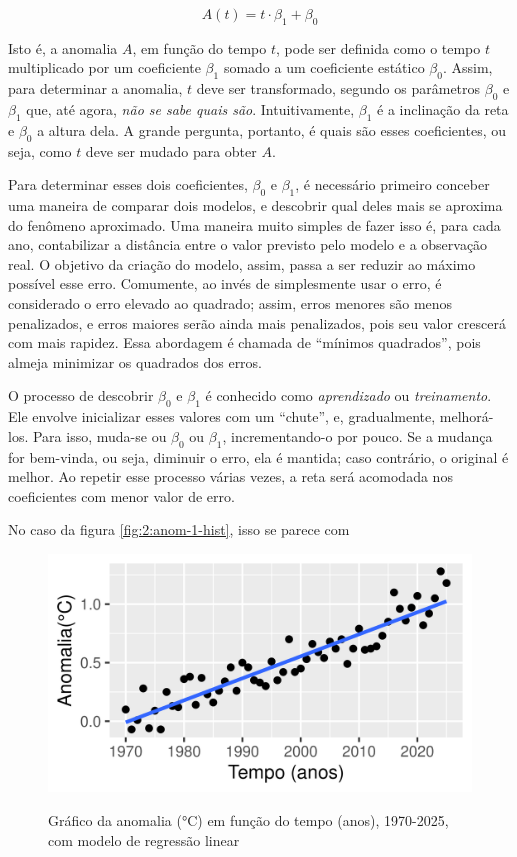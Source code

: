 \begin{equation}
A(t) = t\cdot\beta_1 + \beta_0
\end{equation}

Isto é, a anomalia $A$, em função do tempo $t$, pode ser definida como o tempo $t$ multiplicado por um coeficiente $\beta_1$ somado a um coeficiente estático $\beta_0$.
Assim, para determinar a anomalia, $t$ deve ser transformado, segundo os parâmetros $\beta_0$ e $\beta_1$ que, até agora, \textit{não se sabe quais são}.
Intuitivamente, $\beta_1$ é a inclinação da reta e $\beta_0$ a altura dela.
A grande pergunta, portanto, é quais são esses coeficientes, ou seja, como $t$ deve ser mudado para obter $A$.

Para determinar esses dois coeficientes, $\beta_0$ e $\beta_1$, é necessário primeiro conceber uma maneira de comparar dois modelos, e descobrir qual deles mais se aproxima do fenômeno aproximado.
Uma maneira muito simples de fazer isso é, para cada ano, contabilizar a distância entre o valor previsto pelo modelo e a observação real.
O objetivo da criação do modelo, assim, passa a ser reduzir ao máximo possível esse erro.
Comumente, ao invés de simplesmente usar o erro, é considerado o erro elevado ao quadrado; assim, erros menores são menos penalizados, e erros maiores serão ainda mais penalizados, pois seu valor crescerá com mais rapidez.
Essa abordagem é chamada de ``mínimos quadrados'', pois almeja minimizar os quadrados dos erros.

O processo de descobrir $\beta_0$ e $\beta_1$ é conhecido como \textit{aprendizado} ou \textit{treinamento}.
Ele envolve inicializar esses valores com um ``chute'', e, gradualmente, melhorá-los.
Para isso, muda-se ou $\beta_0$ ou $\beta_1$, incrementando-o por pouco. 
Se a mudança for bem-vinda, ou seja, diminuir o erro, ela é mantida; caso contrário, o original é melhor.
Ao repetir esse processo várias vezes, a reta será acomodada nos coeficientes com menor valor de erro.

No caso da figura \ref{fig:2:anom-1-hist}, isso se parece com 

\begin{figure}[H]
    \centering
    \caption{Gráfico da anomalia (°C) em função do tempo (anos), 1970-2025, com modelo de regressão linear}
    \includegraphics[width=\linewidth]{static/R/plot/anom-3-scatter+reg.png}
    \label{fig:2:anom-3-scatter+reg}
\end{figure}

